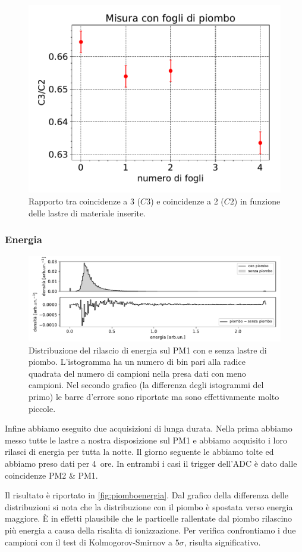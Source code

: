 \begin{figure}
\centering
\includegraphics[width=8 cm]{confronto}
\caption{Rapporto tra coincidenze a 3 ($C3$) e coincidenze a 2 ($C2$) in funzione delle lastre di materiale inserite.}
\label{cfr}
\end{figure}

\subsubsection{Energia}

\begin{figure}
	\hspace{-7.5em}
	\includegraphics[width=1.4\textwidth]{piombo_energia}
	\caption{\label{fig:piomboenergia}
	Distribuzione del rilascio di energia sul PM1 con e senza lastre di piombo.
	L'istogramma ha un numero di bin pari alla radice quadrata del numero di campioni nella presa dati con meno campioni.
	Nel secondo grafico (la differenza degli istogrammi del primo)
	le barre d'errore sono riportate ma sono effettivamente molto piccole.}
\end{figure}

Infine abbiamo eseguito due acquisizioni di lunga durata.
Nella prima abbiamo messo tutte le lastre a nostra disposizione sul PM1
e abbiamo acquisito i loro rilasci di energia per tutta la notte.
Il giorno seguente le abbiamo tolte ed abbiamo preso dati per \SI{4}{ore}.
In entrambi i casi il trigger dell'ADC è dato dalle coincidenze PM2 \& PM1.

Il risultato è riportato in \autoref{fig:piomboenergia}.
Dal grafico della differenza delle distribuzioni
si nota che la distribuzione con il piombo è spostata verso energia maggiore.
È in effetti plausibile che le particelle rallentate dal piombo
rilascino più energia a causa della risalita di ionizzazione.
Per verifica confrontiamo i due campioni con il test di Kolmogorov-Smirnov a $5\sigma$,
risulta significativo.
